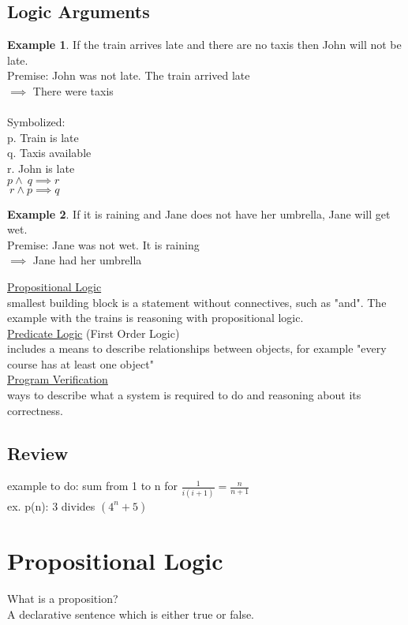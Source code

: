 \documentclass[12pt,oneside,fleqn]{article}
\theoremstyle{definition}
\newtheorem{ex}{Example}[subsection]
\begin{document}
\subsection{Logic Arguments}
\begin{ex}
If the train arrives late and there are no taxis then John will not be late. \\
Premise: John was not late. The train arrived late \\
$\implies$ There were taxis \\ \\
Symbolized: \\
p. Train is late \\
q. Taxis available\\
r. John is late \\
$p \wedge ~q \implies r$ \\
$~r \wedge p \implies q$
\end{ex}

\begin{ex}
If it is raining and Jane does not have her umbrella, Jane will get wet. \\
Premise: Jane was not wet. It is raining \\
$\implies$ Jane had her umbrella
\end{ex}

\underline{Propositional Logic} \\
smallest building block is a statement without connectives, such as "and". The example with the trains is reasoning with propositional logic. \\
\underline{Predicate Logic} (First Order Logic) \\
includes a means to describe relationships between objects, for example "every course has at least one object" \\
\underline{Program Verification} \\
ways to describe what a system is required to do and reasoning about its correctness. \\

\subsection{Review}
example to do:
sum from 1 to n for $ \frac{1}{i(i+1)} = \frac{n}{ n+1}$ \\
ex. p(n): 3 divides $(4^n + 5)$

\section{Propositional Logic}
What is a proposition? \\
A declarative sentence which is either true or false.
\end{document}
